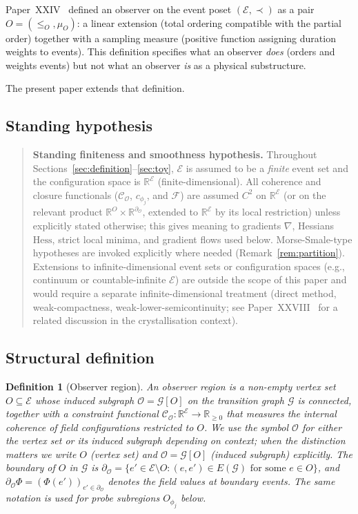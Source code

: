 \documentclass[12pt]{article}
\newtheorem{definition}[theorem]{Definition}
\newcommand{\Ecal}{\mathcal{E}}
\newcommand{\Gcal}{\mathcal{G}}
\newcommand{\Fcal}{\mathcal{F}}
\newcommand{\Ocal}{\mathcal{O}}
\newcommand{\Ccal}{\mathcal{C}}
\begin{document}
Paper~XXIV~\citep{SmartXXIV} defined an observer on the event poset $(\Ecal, \prec)$ as a pair $O = (\leq_O, \mu_O)$: a linear extension (total ordering compatible with the partial order) together with a sampling measure (positive function assigning duration weights to events). This definition specifies what an observer \textit{does} (orders and weights events) but not what an observer \textit{is} as a physical substructure.

The present paper extends that definition.

\subsection{Standing hypothesis}\label{subsec:standing}

\begin{quote}
\textbf{Standing finiteness and smoothness hypothesis.} Throughout Sections~\ref{sec:definition}--\ref{sec:toy}, $\Ecal$ is assumed to be a \emph{finite} event set and the configuration space is $\mathbb{R}^\Ecal$ (finite-dimensional). All coherence and closure functionals ($\Ccal_\Ocal$, $c_{\phi_j}$, and $\Fcal$) are assumed $C^2$ on $\mathbb{R}^\Ecal$ (or on the relevant product $\mathbb{R}^O \times \mathbb{R}^{\partial_\Ocal}$, extended to $\mathbb{R}^\Ecal$ by its local restriction) unless explicitly stated otherwise; this gives meaning to gradients $\nabla$, Hessians $\mathrm{Hess}$, strict local minima, and gradient flows used below. Morse-Smale-type hypotheses are invoked explicitly where needed (Remark~\ref{rem:partition}). Extensions to infinite-dimensional event sets or configuration spaces (e.g., continuum or countable-infinite $\Ecal$) are outside the scope of this paper and would require a separate infinite-dimensional treatment (direct method, weak-compactness, weak-lower-semicontinuity; see Paper~XXVIII~\citep{SmartXXVIII} for a related discussion in the crystallisation context).
\end{quote}

\subsection{Structural definition}

\begin{definition}[Observer region]\label{def:observer_region}
An \textit{observer region} is a non-empty vertex set $O \subseteq \Ecal$ whose induced subgraph $\Ocal = \Gcal[O]$ on the transition graph $\Gcal$ is connected, together with a constraint functional $\Ccal_\Ocal: \mathbb{R}^\Ecal \to \mathbb{R}_{\geq 0}$ that measures the internal coherence of field configurations restricted to $O$. We use the symbol $\Ocal$ for either the vertex set or its induced subgraph depending on context; when the distinction matters we write $O$ (vertex set) and $\Ocal = \Gcal[O]$ (induced subgraph) explicitly. The \emph{boundary} of $O$ in $\Gcal$ is $\partial_\Ocal = \{e' \in \Ecal \setminus O : (e, e') \in E(\Gcal)\text{ for some } e \in O\}$, and $\partial_\Ocal \Phi = (\Phi(e'))_{e' \in \partial_\Ocal}$ denotes the field values at boundary events. The same notation is used for probe subregions $O_{\phi_j}$ below.
\end{definition}
\end{document}
